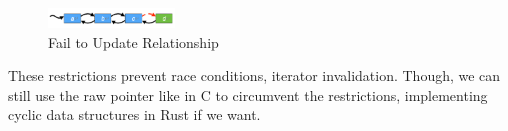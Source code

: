 \documentclass[10pt,a4paper,twocolumn]{article}
\begin{document}
\begin{figure}[H] %
    \centering %
    \includegraphics[width=0.3\textwidth]{1} %
    \caption{Fail to Update Relationship} %
    \label{linked} %
\end{figure}

These restrictions prevent race conditions, iterator invalidation. Though, we can still use the raw pointer like in C to circumvent the restrictions, implementing cyclic data structures in Rust if we want.

\end{document}
